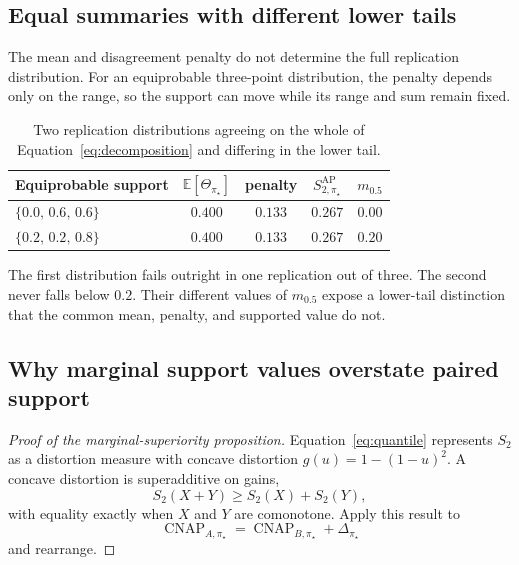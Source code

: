 \documentclass[11pt]{article}
\newcommand{\CNAP}{\operatorname{CNAP}}
\newcommand{\E}{\mathbb{E}}
\newcommand{\SAP}{S_{2,\pi_\star}^{\mathrm{AP}}}
\theoremstyle{remark}
\begin{document}
\subsection{Equal summaries with different lower tails}
\label{app:collision-tail}

The mean and disagreement penalty do not determine the full replication distribution. For an equiprobable three-point distribution, the penalty depends only on the range, so the support can move while its range and sum remain fixed.

\begin{table}[ht]
\centering
\caption{Two replication distributions agreeing on the whole of Equation~\eqref{eq:decomposition} and differing in the lower tail.}
\label{tab:collision-tail}
\begin{tabular}{@{}lcccc@{}}
\toprule
Equiprobable support & $\E[\Theta_{\pi_\star}]$ & penalty & $\SAP$ & $m_{0.5}$ \\
\midrule
$\{0.0,\,0.6,\,0.6\}$ & $0.400$ & $0.133$ & $0.267$ & $0.00$ \\
$\{0.2,\,0.2,\,0.8\}$ & $0.400$ & $0.133$ & $0.267$ & $0.20$ \\
\bottomrule
\end{tabular}
\end{table}

The first distribution fails outright in one replication out of three. The second never falls below $0.2$. Their different values of $m_{0.5}$ expose a lower-tail distinction that the common mean, penalty, and supported value do not.

\subsection{Why marginal support values overstate paired support}
\label{app:marginal-proof}

\begin{proof}[Proof of the marginal-superiority proposition]
Equation~\eqref{eq:quantile} represents $S_2$ as a distortion measure with concave distortion $g(u)=1-(1-u)^2$. A concave distortion is superadditive on gains,
\[
S_2(X+Y)\geq S_2(X)+S_2(Y),
\]
with equality exactly when $X$ and $Y$ are comonotone. Apply this result to
\[
\CNAP_{A,\pi_\star}
=
\CNAP_{B,\pi_\star}+\Delta_{\pi_\star}
\]
and rearrange.
\end{proof}
\end{document}
